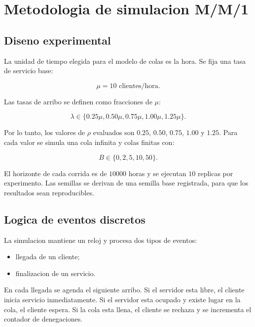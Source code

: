 \section{Metodologia de simulacion M/M/1}

\subsection{Diseno experimental}

La unidad de tiempo elegida para el modelo de colas es la hora. Se fija una tasa de servicio base:

\begin{equation}
    \mu = 10 \text{ clientes/hora}.
\end{equation}

Las tasas de arribo se definen como fracciones de $\mu$:

\begin{equation}
    \lambda \in \{0.25\mu, 0.50\mu, 0.75\mu, 1.00\mu, 1.25\mu\}.
\end{equation}

Por lo tanto, los valores de $\rho$ evaluados son $0.25$, $0.50$, $0.75$, $1.00$ y $1.25$. Para cada valor se simula una cola infinita y colas finitas con:

\begin{equation}
    B \in \{0,2,5,10,50\}.
\end{equation}

El horizonte de cada corrida es de $10000$ horas y se ejecutan $10$ replicas por experimento. Las semillas se derivan de una semilla base registrada, para que los resultados sean reproducibles.

\subsection{Logica de eventos discretos}

La simulacion mantiene un reloj y procesa dos tipos de eventos:

\begin{itemize}
    \item llegada de un cliente;
    \item finalizacion de un servicio.
\end{itemize}

En cada llegada se agenda el siguiente arribo. Si el servidor esta libre, el cliente inicia servicio inmediatamente. Si el servidor esta ocupado y existe lugar en la cola, el cliente espera. Si la cola esta llena, el cliente se rechaza y se incrementa el contador de denegaciones.

